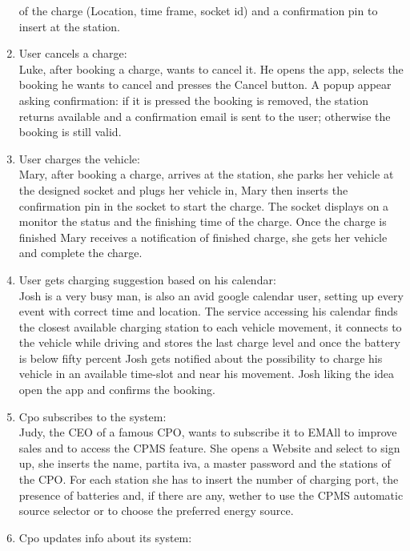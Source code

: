 \begin{enumerate}[label=\textbf{S\arabic*}]
            of the charge (Location, time frame, socket id) and a confirmation pin to insert at the station.
      \item User cancels a charge:\\
            Luke, after booking a charge, wants to cancel it. He opens the app, selects the booking he wants to cancel and presses the Cancel button. A popup appear asking confirmation: if it is pressed the booking is removed, the station returns available and a confirmation email is sent to the user; otherwise the booking is still valid.
      \item User charges the vehicle:\\
            Mary, after booking a charge, arrives at the station, she parks her vehicle at the designed socket
            and plugs her vehicle in, Mary then inserts the confirmation pin in the socket to start the charge.
            The socket displays on a monitor the status and the finishing time of the charge.
            Once the charge is finished Mary receives a notification of finished charge,
            she gets her vehicle and complete the charge.
      \item User gets charging suggestion based on his calendar:\\
            Josh is a very busy man, is also an avid google calendar user,
            setting up every event with correct time and location.
            The service accessing his calendar finds the closest available charging station to each vehicle movement,
            it connects to the vehicle while driving and stores the last charge level and once the battery is below fifty percent Josh gets notified
            about the possibility to charge his vehicle in an available time-slot and near his movement.
            Josh liking the idea open the app and confirms the booking.
      \item Cpo subscribes to the system:\\
            Judy, the CEO of a famous CPO, wants to subscribe it to EMAll to improve sales and to access the CPMS feature.
            She opens a Website and select to sign up, she inserts the name, partita iva, a master password and the stations of the CPO.
            For each station she has to insert the number of charging port, the presence of batteries and, if there are any,
            wether to use the CPMS automatic source selector or to choose the preferred energy source.
      \item Cpo updates info about its system:\\

\end{enumerate}
